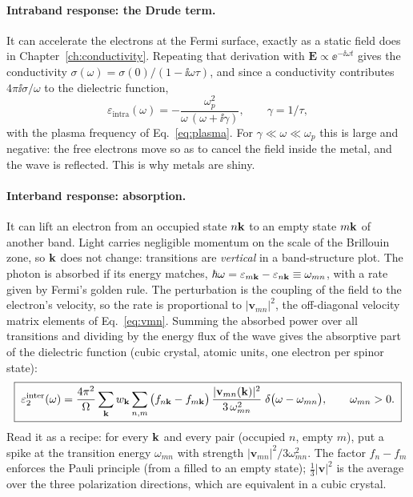 \paragraph{Intraband response: the Drude term.} It can accelerate the
electrons at the Fermi surface, exactly as a static field does in
Chapter~\ref{ch:conductivity}. Repeating that derivation with
$\mathbf E\propto\ee^{-\ii\omega t}$ gives the conductivity
$\sigma(\omega) = \sigma(0)/(1-\ii\omega\tau)$, and since a conductivity
contributes $4\pi\ii\sigma/\omega$ to the dielectric function,
\begin{equation}
\varepsilon_{\mathrm{intra}}(\omega) = -\frac{\omega_p^2}{\omega\,(\omega +
\ii\gamma)},
\qquad \gamma = 1/\tau ,
\label{eq:drude}
\end{equation}
with the plasma frequency of Eq.~\eqref{eq:plasma}. For
$\gamma\ll\omega\ll\omega_p$ this is large and negative: the free
electrons move so as to cancel the field inside the metal, and the wave is
reflected. This is why metals are shiny.

\paragraph{Interband response: absorption.} It can lift an electron from
an occupied state $n\mathbf{k}$ to an empty state $m\mathbf{k}$ of another band. Light
carries negligible momentum on the scale of the Brillouin zone, so $\mathbf{k}$
does not change: transitions are \emph{vertical} in a band-structure plot.
The photon is absorbed if its energy matches,
$\hbar\omega = \varepsilon_{m\mathbf{k}}-\varepsilon_{n\mathbf{k}}\equiv\omega_{mn}$,
with a rate given by Fermi's golden rule. The perturbation is the coupling
of the field to the electron's velocity, so the rate is proportional to
$|\mathbf v_{mn}|^2$, the off-diagonal velocity matrix elements of
Eq.~\eqref{eq:vmn}. Summing the absorbed power over all transitions and
dividing by the energy flux of the wave gives the absorptive part of the
dielectric function (cubic crystal, atomic units, one electron per spinor
state):
\begin{equation}
\boxed{\;
\varepsilon_2^{\mathrm{inter}}(\omega) = \frac{4\pi^2}{\Omega}
\sum_{\mathbf{k}} w_{\mathbf{k}} \sum_{n,m}\big(f_{n\mathbf{k}}-f_{m\mathbf{k}}\big)\,
\frac{|\mathbf v_{mn}(\mathbf{k})|^2}{3\,\omega_{mn}^2}\;
\delta\big(\omega - \omega_{mn}\big),
\qquad \omega_{mn} > 0 .\;}
\label{eq:eps2}
\end{equation}
Read it as a recipe: for every $\mathbf{k}$ and every pair (occupied $n$, empty
$m$), put a spike at the transition energy $\omega_{mn}$ with strength
$|\mathbf v_{mn}|^2/3\omega_{mn}^2$. The factor $f_n - f_m$ enforces the
Pauli principle (from a filled to an empty state); $\tfrac13|\mathbf
v|^2$ is the average over the three polarization directions, which are
equivalent in a cubic crystal.


